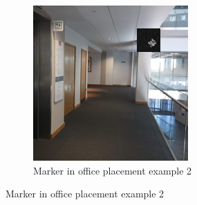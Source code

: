 \documentclass[conference]{IEEEtran}
\begin{document}
\begin{figure}[h]
\begin{subfigure}[b]{0.2\textwidth}
      \includegraphics[width=\textwidth]{images/aruco-file4-detection-2.png}
      \caption{Marker in office placement example 2}
      \label{fig:det_ex_2}
  \end{subfigure}
  
  \vspace{0.5cm}
  

\end{figure}
\end{document}
